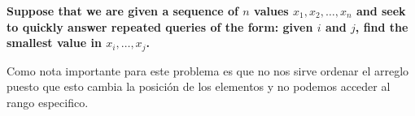 \textbf{Suppose that we are given a sequence of $n$ values $x_1, x_2, \dots, x_n$ and seek to quickly answer repeated queries of the form: given $i$ and $j$, find the smallest value in $x_i, \dots, x_j$.}\vspace{.2cm}

Como nota importante para este problema es que no nos sirve ordenar el arreglo puesto que esto cambia la posición de los elementos y no podemos acceder al rango especifico. \vspace{.2cm}